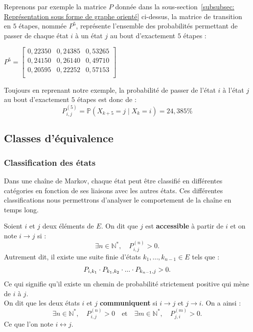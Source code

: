 \documentclass{article}
\begin{document}
\begin{tcolorbox}[colback=white,colframe=yellow!80!black,title=Exemple, breakable]
Reprenons par exemple la matrice $P$ donnée dans la sous-section~\ref{subsubsec: Représentation sous forme de graphe orienté} ci-dessus, la matrice de transition en $5$ étapes, nommée $P^{5}$, représente l'ensemble des probabilités permettant de passer de chaque état $i$ à un état $j$ au bout d'exactement $5$ étapes :
\begin{center}
$
P^{5} = \begin{bmatrix}
0,22350 & 0,24385 & 0,53265 \\
0,24150 & 0,26140 & 0,49710 \\
0,20595 & 0,22252 & 0,57153 \\
\end{bmatrix}
$
\end{center}
Toujours en reprenant notre exemple, la probabilité de passer de l'état $i$ à l'état $j$ au bout d'exactement $5$ étapes est donc de :
\[
P_{i,j}^{(5)} = \mathbb{P}(X_{k+5} = j \mid X_k = i) = 24,385\%
\]
\end{tcolorbox}

\subsection{Classes d'équivalence}

\subsubsection{Classification des états}
\label{subsubsec: Les différents types d'états}

Dans une chaîne de Markov, chaque état peut être classifié en différentes catégories en fonction de ses liaisons avec les autres états. Ces différentes classifications nous permettrons d'analyser le comportement de la chaîne en temps long. \\

\begin{tcolorbox}[colback=white,colframe=red!80!black,title=Accessibilité et communication]
Soient $i$ et $j$ deux éléments de $E$. On dit que $j$ est \textbf{accessible} à partir de $i$ et on note $i \to j$ si :
\[
\exists n \in \mathbb{N}^{*}, \quad P_{i,j}^{(n)} > 0.
\]
Autrement dit, il existe une suite finie d'états $k_1, \dots, k_{n-1} \in E$ tels que :
\[
P_{i,k_1} \cdot P_{k_1,k_2}\cdot ... \cdot P_{k_{n-1},j} > 0. \\
\]
Ce qui signifie qu'il existe un chemin de probabilité strictement positive qui mène de $i$ à $j$. \\

On dit que les deux états $i$ et $j$ \textbf{communiquent} si $i \rightarrow j$ et $j \rightarrow i$. On a ainsi :
\[
\exists n \in \mathbb{N}^{*}, \quad P_{i,j}^{(n)} > 0 \quad \text{et} \quad \exists m \in \mathbb{N}^{*}, \quad P_{j,i}^{(m)} > 0.
\]
Ce que l'on note $i \leftrightarrow j$.
\end{tcolorbox}
\end{document}
